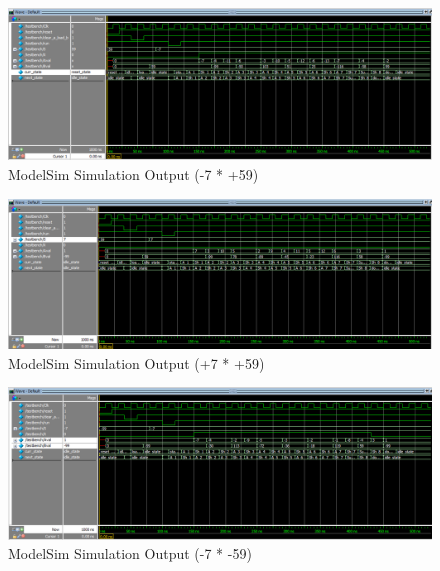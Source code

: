 \documentclass[journal, twocolumn, final,11pt,letterpaper]{IEEEtran}
\begin{document}
\begin{figure} [htbp]
	\centering
	\includegraphics[scale=0.4]{simulation2.png}
	\caption{ModelSim Simulation Output (-7 * +59)\label{fig:simulation2t}}
\end{figure}

\begin{figure} [htbp]
	\centering
	\includegraphics[scale=0.4]{simulation3.png}
	\caption{ModelSim Simulation Output (+7 * +59)\label{fig:simulation3}}
\end{figure}

\begin{figure} [htbp]
	\centering
	\includegraphics[scale=0.4]{simulation4.png}
	\caption{ModelSim Simulation Output (-7 * -59)\label{fig:simulation4}}
\end{figure}
\end{document}
